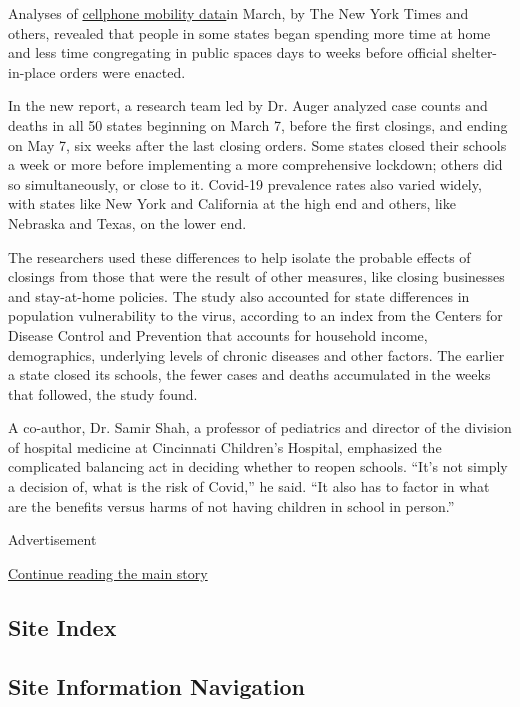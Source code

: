 Analyses of
\href{https://www.nytimes3xbfgragh.onion/interactive/2020/04/02/us/coronavirus-social-distancing.html}{cellphone
mobility data}in March, by The New York Times and others, revealed that
people in some states began spending more time at home and less time
congregating in public spaces days to weeks before official
shelter-in-place orders were enacted.

In the new report, a research team led by Dr. Auger analyzed case counts
and deaths in all 50 states beginning on March 7, before the first
closings, and ending on May 7, six weeks after the last closing orders.
Some states closed their schools a week or more before implementing a
more comprehensive lockdown; others did so simultaneously, or close to
it. Covid-19 prevalence rates also varied widely, with states like New
York and California at the high end and others, like Nebraska and Texas,
on the lower end.

The researchers used these differences to help isolate the probable
effects of closings from those that were the result of other measures,
like closing businesses and stay-at-home policies. The study also
accounted for state differences in population vulnerability to the
virus, according to an index from the Centers for Disease Control and
Prevention that accounts for household income, demographics, underlying
levels of chronic diseases and other factors. The earlier a state closed
its schools, the fewer cases and deaths accumulated in the weeks that
followed, the study found.

A co-author, Dr. Samir Shah, a professor of pediatrics and director of
the division of hospital medicine at Cincinnati Children's Hospital,
emphasized the complicated balancing act in deciding whether to reopen
schools. ``It's not simply a decision of, what is the risk of Covid,''
he said. ``It also has to factor in what are the benefits versus harms
of not having children in school in person.''

Advertisement

\protect\hyperlink{after-bottom}{Continue reading the main story}

\hypertarget{site-index}{%
\subsection{Site Index}\label{site-index}}

\hypertarget{site-information-navigation}{%
\subsection{Site Information
Navigation}\label{site-information-navigation}}

